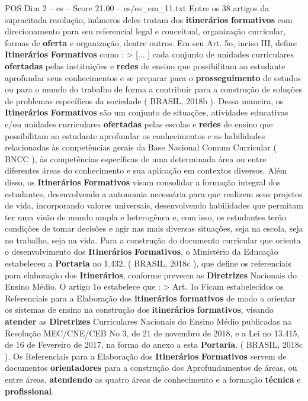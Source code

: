 \begin{textsample}{POS Dim 2 – es – Score 21.00 – es/es\_em\_11.txt}
Entre os 38 artigos da supracitada resolução, inúmeros deles tratam dos \textbf{itinerários} \textbf{formativos} com direcionamento para seu referencial legal e conceitual, organização curricular, formas de \textbf{oferta} e organização, dentre outros.
Em seu Art. 5o, inciso III, define \textbf{Itinerários} \textbf{Formativos} como : > [... ] cada conjunto de unidades curriculares \textbf{ofertadas} pelas instituições e \textbf{redes} de ensino que possibilitam ao estudante aprofundar seus conhecimentos e se preparar para o \textbf{prosseguimento} de estudos ou para o mundo do trabalho de forma a contribuir para a construção de soluções de problemas específicos da sociedade ( BRASIL, 2018b ).
Dessa maneira, os \textbf{Itinerários} \textbf{Formativos} são um conjunto de situações, atividades educativas e/ou unidades curriculares \textbf{ofertadas} pelas escolas e \textbf{redes} de ensino que possibilitam ao estudante aprofundar os conhecimentos e as habilidades relacionadas às competências gerais da Base Nacional Comum Curricular ( BNCC ), às competências específicas de uma determinada área ou entre diferentes áreas do conhecimento e sua aplicação em contextos diversos.
Além disso, os \textbf{Itinerários} \textbf{Formativos} visam consolidar a formação integral dos estudantes, desenvolvendo a autonomia necessária para que realizem seus projetos de vida, incorporando valores universais, desenvolvendo habilidades que permitam ter uma visão de mundo ampla e heterogênea e, com isso, os estudantes terão condições de tomar decisões e agir nas mais diversas situações, seja na escola, seja no trabalho, seja na vida.
Para a construção do documento curricular que orienta o desenvolvimento dos \textbf{Itinerários} \textbf{Formativos}, o Ministério da Educação estabeleceu a \textbf{Portaria} no 1.432, ( BRASIL, 2018c ), que define os referenciais para elaboração dos \textbf{Itinerários}, conforme preveem as \textbf{Diretrizes} Nacionais do Ensino Médio.
O artigo 1o estabelece que : > Art. 1o Ficam estabelecidos os Referenciais para a Elaboração dos \textbf{itinerários} \textbf{formativos} de modo a orientar os sistemas de ensino na construção dos \textbf{itinerários} \textbf{formativos}, visando \textbf{atender} as \textbf{Diretrizes} Curriculares Nacionais do Ensino Médio publicadas na Resolução MEC/CNE/CEB No 3, de 21 de novembro de 2018, e a Lei no 13.415, de 16 de Fevereiro de 2017, na forma do anexo a esta \textbf{Portaria}. ( BRASIL, 2018c ).
Os Referenciais para a Elaboração dos \textbf{Itinerários} \textbf{Formativos} servem de documentos \textbf{orientadores} para a construção dos Aprofundamentos de áreas, ou entre áreas, \textbf{atendendo} as quatro áreas de conhecimento e a formação \textbf{técnica} e \textbf{profissional}.

\end{textsample}
